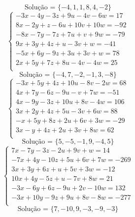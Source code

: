 \documentclass[12pt,oneside,a4paper]{article}
\begin{document}
\begin{equation*}
\text{Solução = }\{-4,1,1,8,4,-2\}
\end{equation*}
\vspace{\baselineskip}
\begin{equation*}
\begin{cases}
-3x-4y-3z+9u-4v-6w=17 \\
8x-2y+z-6u+10v+10w=-92 \\
-8x-7y-7z+7u+v+9w=-79 \\
9x+3y+4z+u-3v+w=-41 \\
-5x+6y-9z+3u+3v+w=78 \\
2x+5y+7z+8u-4v-4w=25 \\
\end{cases}
\end{equation*}
\begin{equation*}
\text{Solução = }\{-4,7,-2,-1,3,-8\}
\end{equation*}
\vspace{\baselineskip}
\begin{equation*}
\begin{cases}
-3x+5y+4z+10u-8v-2w=68 \\
4x+7y-6z-9u-v+7w=-51 \\
4x-9y-3z+10u+8v-4w=106 \\
3x+2y+4z+5u-3v+6w=88 \\
-x+5y+8z+2u+6v+3w=-29 \\
3x-y+4z+2u+3v+8w=62 \\
\end{cases}
\end{equation*}
\begin{equation*}
\text{Solução = }\{5,-5,-1,9,-4,5\}
\end{equation*}
\vspace{\baselineskip}
\begin{equation*}
\begin{cases}
7x-7y-3z-2u+9v+w=14 \\
-7x+4y-10z+5u+6v+7w=-269 \\
3x+3y+6z+u+5v+3w=-12 \\
10x+4y-5z+u-7v+8w=21 \\
-3x-6y+6z-9u+2v-10w=132 \\
-3x+10y-9z+9u+8v-8w=-277 \\
\end{cases}
\end{equation*}
\begin{equation*}
\text{Solução = }\{7,-10,9,-3,-9,-3\}
\end{equation*}
\end{document}
